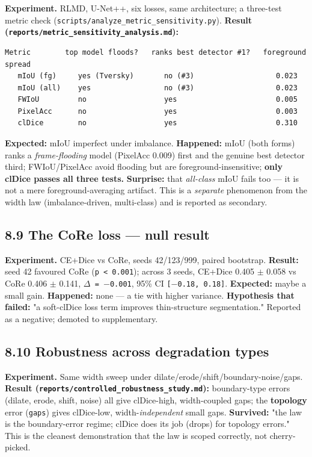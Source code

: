 \documentclass[11pt]{article}
\begin{document}
\textbf{Experiment.} RLMD, U-Net++, six losses, same architecture; a three-test metric check (\texttt{scripts/analyze\_metric\_sensitivity.py}). \textbf{Result (\texttt{reports/metric\_sensitivity\_analysis.md}):}
\begin{Verbatim}[breaklines=true,breakanywhere=true,fontsize=\footnotesize]
   Metric        top model floods?   ranks best detector #1?   foreground spread
   mIoU (fg)     yes (Tversky)       no (#3)                   0.023
   mIoU (all)    yes                 no (#3)                   0.023
   FWIoU         no                  yes                       0.005
   PixelAcc      no                  yes                       0.003
   clDice        no                  yes                       0.310
\end{Verbatim}
\textbf{Expected:} mIoU imperfect under imbalance. \textbf{Happened:} mIoU (both forms) ranks a \textit{frame-flooding} model (PixelAcc 0.009) first and the genuine best detector third; FWIoU/PixelAcc avoid flooding but are foreground-insensitive; \textbf{only clDice passes all three tests.} \textbf{Surprise:} that \textit{all-class} mIoU fails too --- it is not a mere foreground-averaging artifact. This is a \textit{separate} phenomenon from the width law (imbalance-driven, multi-class) and is reported as secondary.

\subsection*{8.9 The CoRe loss --- null result}

\textbf{Experiment.} CE+Dice vs CoRe, seeds 42/123/999, paired bootstrap. \textbf{Result:} seed 42 favoured CoRe (\texttt{p < 0.001}); across 3 seeds, CE+Dice 0.405 $\pm$ 0.058 vs CoRe 0.406 $\pm$ 0.141, \texttt{$\Delta$ = $-$0.001}, 95\% CI \texttt{[$-$0.18, 0.18]}. \textbf{Expected:} maybe a small gain. \textbf{Happened:} none --- a tie with higher variance. \textbf{Hypothesis that failed:} "a soft-clDice loss term improves thin-structure segmentation." Reported as a negative; demoted to supplementary.

\subsection*{8.10 Robustness across degradation types}

\textbf{Experiment.} Same width sweep under dilate/erode/shift/boundary-noise/gaps. \textbf{Result (\texttt{reports/controlled\_robustness\_study.md}):} boundary-type errors (dilate, erode, shift, noise) all give clDice-high, width-coupled gaps; the \textbf{topology} error (\texttt{gaps}) gives clDice-low, width-\textit{independent} small gaps. \textbf{Survived:} "the law is the boundary-error regime; clDice does its job (drops) for topology errors." This is the cleanest demonstration that the law is scoped correctly, not cherry-picked.
\end{document}

